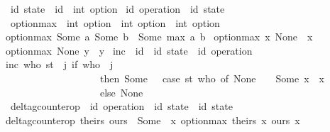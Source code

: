 \begin{isabellebody}
\isamarkupfalse%
\ {\isacharparenleft}{\isacharprime}id{\isacharparenright}\ state\ {\isacharequal}\ {\isachardoublequoteopen}{\isacharprime}id\ {\isasymRightarrow}\ int\ option{\isachardoublequoteclose}\isanewline
{}\isamarkupfalse%
\ {\isacharparenleft}{\isacharprime}id{\isacharparenright}\ operation\ {\isacharequal}\ {\isachardoublequoteopen}{\isacharprime}id\ state{\isachardoublequoteclose}\isanewline
\isanewline
{}\isamarkupfalse%
\ option{\isacharunderscore}max\ {\isacharcolon}{\isacharcolon}\ {\isachardoublequoteopen}int\ option\ {\isasymRightarrow}\ int\ option\ {\isasymRightarrow}\ int\ option{\isachardoublequoteclose}\ \ \isanewline
{\isachardoublequoteopen}option{\isacharunderscore}max\ {\isacharparenleft}Some\ a{\isacharparenright}\ {\isacharparenleft}Some\ b{\isacharparenright}\ {\isacharequal}\ Some\ {\isacharparenleft}max\ a\ b{\isacharparenright}{\isachardoublequoteclose}\ {\isacharbar}\isanewline
{\isachardoublequoteopen}option{\isacharunderscore}max\ x\ None\ {\isacharequal}\ x{\isachardoublequoteclose}\ {\isacharbar}\isanewline
{\isachardoublequoteopen}option{\isacharunderscore}max\ None\ y\ {\isacharequal}\ y{\isachardoublequoteclose}\isanewline
\isanewline
{}\isamarkupfalse%
\ inc\ {\isacharcolon}{\isacharcolon}\ {\isachardoublequoteopen}{\isacharprime}id\ {\isasymRightarrow}\ {\isacharparenleft}{\isacharprime}id\ state{\isacharparenright}\ {\isasymRightarrow}\ {\isacharparenleft}{\isacharprime}id\ operation{\isacharparenright}{\isachardoublequoteclose}\ \isanewline
{\isachardoublequoteopen}inc\ who\ st\ {\isacharequal}\ {\isacharparenleft}{\isasymlambda}j{\isachardot}\ if\ who\ {\isacharequal}\ j\isanewline
\ \ \ \ \ \ \ \ \ \ \ \ \ \ \ \ \ \ \ then\ Some\ {\isacharparenleft}{}\ {\isacharplus}\ {\isacharparenleft}case\ {\isacharparenleft}st\ who{\isacharparenright}\ of\ None\ {\isasymRightarrow}\ {}\ {\isacharbar}\ Some\ {\isacharparenleft}x{\isacharparenright}\ {\isasymRightarrow}\ x{\isacharparenright}{\isacharparenright}\isanewline
\ \ \ \ \ \ \ \ \ \ \ \ \ \ \ \ \ \ \ else\ None{\isacharparenright}{\isachardoublequoteclose}\isanewline
\isanewline
{}\isamarkupfalse%
\ delta{\isacharunderscore}gcounter{\isacharunderscore}op\ {\isacharcolon}{\isacharcolon}\ {\isachardoublequoteopen}{\isacharparenleft}{\isacharprime}id\ operation{\isacharparenright}\ {\isasymRightarrow}\ {\isacharparenleft}{\isacharprime}id\ state{\isacharparenright}\ {\isasymrightharpoonup}\ {\isacharparenleft}{\isacharprime}id\ state{\isacharparenright}{\isachardoublequoteclose}\ \isanewline
{\isachardoublequoteopen}delta{\isacharunderscore}gcounter{\isacharunderscore}op\ theirs\ ours\ {\isacharequal}\ Some\ {\isacharparenleft}{\isasymlambda}\ x{\isachardot}\ option{\isacharunderscore}max\ {\isacharparenleft}theirs\ x{\isacharparenright}\ {\isacharparenleft}ours\ x{\isacharparenright}{\isacharparenright}{\isachardoublequoteclose}
\end{isabellebody}
